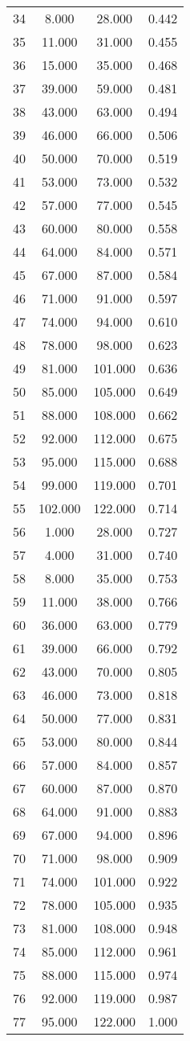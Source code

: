\begin{tabular}{cccc}
  34 & 8.000 & 28.000 & 0.442 \\ 
  35 & 11.000 & 31.000 & 0.455 \\ 
  36 & 15.000 & 35.000 & 0.468 \\ 
  37 & 39.000 & 59.000 & 0.481 \\ 
  38 & 43.000 & 63.000 & 0.494 \\ 
  39 & 46.000 & 66.000 & 0.506 \\ 
  40 & 50.000 & 70.000 & 0.519 \\ 
  41 & 53.000 & 73.000 & 0.532 \\ 
  42 & 57.000 & 77.000 & 0.545 \\ 
  43 & 60.000 & 80.000 & 0.558 \\ 
  44 & 64.000 & 84.000 & 0.571 \\ 
  45 & 67.000 & 87.000 & 0.584 \\ 
  46 & 71.000 & 91.000 & 0.597 \\ 
  47 & 74.000 & 94.000 & 0.610 \\ 
  48 & 78.000 & 98.000 & 0.623 \\ 
  49 & 81.000 & 101.000 & 0.636 \\ 
  50 & 85.000 & 105.000 & 0.649 \\ 
  51 & 88.000 & 108.000 & 0.662 \\ 
  52 & 92.000 & 112.000 & 0.675 \\ 
  53 & 95.000 & 115.000 & 0.688 \\ 
  54 & 99.000 & 119.000 & 0.701 \\ 
  55 & 102.000 & 122.000 & 0.714 \\ 
  56 & 1.000 & 28.000 & 0.727 \\ 
  57 & 4.000 & 31.000 & 0.740 \\ 
  58 & 8.000 & 35.000 & 0.753 \\ 
  59 & 11.000 & 38.000 & 0.766 \\ 
  60 & 36.000 & 63.000 & 0.779 \\ 
  61 & 39.000 & 66.000 & 0.792 \\ 
  62 & 43.000 & 70.000 & 0.805 \\ 
  63 & 46.000 & 73.000 & 0.818 \\ 
  64 & 50.000 & 77.000 & 0.831 \\ 
  65 & 53.000 & 80.000 & 0.844 \\ 
  66 & 57.000 & 84.000 & 0.857 \\ 
  67 & 60.000 & 87.000 & 0.870 \\ 
  68 & 64.000 & 91.000 & 0.883 \\ 
  69 & 67.000 & 94.000 & 0.896 \\ 
  70 & 71.000 & 98.000 & 0.909 \\ 
  71 & 74.000 & 101.000 & 0.922 \\ 
  72 & 78.000 & 105.000 & 0.935 \\ 
  73 & 81.000 & 108.000 & 0.948 \\ 
  74 & 85.000 & 112.000 & 0.961 \\ 
  75 & 88.000 & 115.000 & 0.974 \\ 
  76 & 92.000 & 119.000 & 0.987 \\ 
  77 & 95.000 & 122.000 & 1.000 \\ 
   \hline
\end{tabular}
